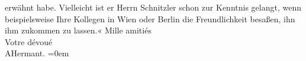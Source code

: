 \begin{ledgroupsized}[t]{13cm}
{{{                     erwähnt habe. Vielleicht ist er Herrn Schnitzler schon zur Kenntnis gelangt, wenn beispielsweise Ihre
                     Kollegen in Wien oder Berlin die Freundlichkeit besaßen, ihn ihm zukommen zu
                     lassen.«}}}\label{K_L02778-11h}\pend
           \pstart
           Mille amitiés{\\[\baselineskip]} Votre dévoué{\\[\baselineskip]}\spacefill\mbox{AHermant.}\pend
           \leftskip=0em{}
         
         \endnumbering{}\end{ledgroupsized}  \newcommand{\dateiname}{L02778}\newcommand{\titel}{Paul Goldmann an Arthur Schnitzler, 22. 6. [1896]}\newcommand{\editorInnen}{Martin Anton Müller und Laura Untner}
      